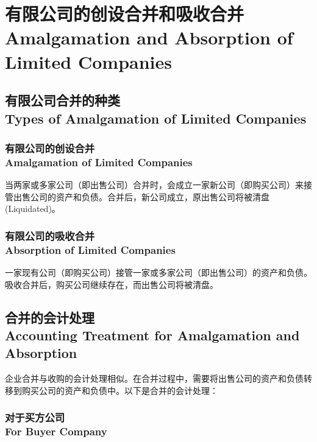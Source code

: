 \documentclass{article}
\begin{document}
\newpage

\section{有限公司的创设合并和吸收合并\\Amalgamation and Absorption of Limited Companies}

\subsection{有限公司合并的种类\\Types of Amalgamation of Limited Companies}

\subsubsection{有限公司的创设合并\\Amalgamation of Limited Companies}

\noindent 当两家或多家公司（即出售公司）合并时，会成立一家新公司（即购买公司）来接管出售公司的资产和负债。合并后，新公司成立，原出售公司将被清盘 (Liquidated)。


\subsubsection{有限公司的吸收合并\\Absorption of Limited Companies}

\noindent 一家现有公司（即购买公司）接管一家或多家公司（即出售公司）的资产和负债。吸收合并后，购买公司继续存在，而出售公司将被清盘。

\subsection{合并的会计处理\\Accounting Treatment for Amalgamation and Absorption}

\noindent 企业合并与收购的会计处理相似。在合并过程中，需要将出售公司的资产和负债转移到购买公司的资产和负债中。以下是合并的会计处理：

\subsubsection{对于买方公司\\For Buyer Company}
\end{document}
